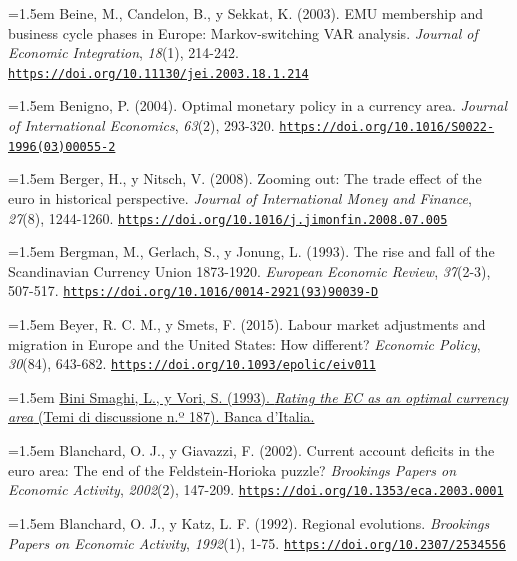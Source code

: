 \documentclass[10pt,a4paper]{article}
\begin{document}
\noindent\hangindent=1.5em Beine, M., Candelon, B., y Sekkat, K. (2003). EMU membership and business cycle phases in Europe: Markov-switching VAR analysis. \textit{Journal of Economic Integration}, \textit{18}(1), 214-242. \href{https://doi.org/10.11130/jei.2003.18.1.214}{\nolinkurl{https://doi.org/10.11130/jei.2003.18.1.214}}

\noindent\hangindent=1.5em Benigno, P. (2004). Optimal monetary policy in a currency area. \textit{Journal of International Economics}, \textit{63}(2), 293-320. \href{https://doi.org/10.1016/S0022-1996(03)00055-2}{\nolinkurl{https://doi.org/10.1016/S0022-1996(03)00055-2}}

\noindent\hangindent=1.5em Berger, H., y Nitsch, V. (2008). Zooming out: The trade effect of the euro in historical perspective. \textit{Journal of International Money and Finance}, \textit{27}(8), 1244-1260. \href{https://doi.org/10.1016/j.jimonfin.2008.07.005}{\nolinkurl{https://doi.org/10.1016/j.jimonfin.2008.07.005}}

\noindent\hangindent=1.5em Bergman, M., Gerlach, S., y Jonung, L. (1993). The rise and fall of the Scandinavian Currency Union 1873-1920. \textit{European Economic Review}, \textit{37}(2-3), 507-517. \href{https://doi.org/10.1016/0014-2921(93)90039-D}{\nolinkurl{https://doi.org/10.1016/0014-2921(93)90039-D}}

\noindent\hangindent=1.5em Beyer, R. C. M., y Smets, F. (2015). Labour market adjustments and migration in Europe and the United States: How different? \textit{Economic Policy}, \textit{30}(84), 643-682. \href{https://doi.org/10.1093/epolic/eiv011}{\nolinkurl{https://doi.org/10.1093/epolic/eiv011}}

\noindent\hangindent=1.5em \href{https://www.bancaditalia.it/pubblicazioni/temi-discussione/1993/1993-0187/index.html}{Bini Smaghi, L., y Vori, S. (1993). \textit{Rating the EC as an optimal currency area} (Temi di discussione n.º 187). Banca d'Italia.}

\noindent\hangindent=1.5em Blanchard, O. J., y Giavazzi, F. (2002). Current account deficits in the euro area: The end of the Feldstein-Horioka puzzle? \textit{Brookings Papers on Economic Activity}, \textit{2002}(2), 147-209. \href{https://doi.org/10.1353/eca.2003.0001}{\nolinkurl{https://doi.org/10.1353/eca.2003.0001}}

\noindent\hangindent=1.5em Blanchard, O. J., y Katz, L. F. (1992). Regional evolutions. \textit{Brookings Papers on Economic Activity}, \textit{1992}(1), 1-75. \href{https://doi.org/10.2307/2534556}{\nolinkurl{https://doi.org/10.2307/2534556}}
\end{document}
